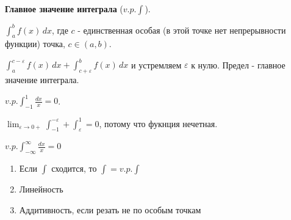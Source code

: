 \begin{definition}
    \textbf{Главное значение интеграла} ($v.p. \int$).

    $\int_{a}^{b} f(x) \, dx$, где $c$ - единственная особая (в этой точке нет непрерывности функции) точка, $c \in (a, b)$.

    $\int_{a}^{c - \varepsilon} f(x) \, dx + \int_{c + \varepsilon}^{b} f(x) \, dx$
    и устремляем $\varepsilon$ к нулю. Предел - главное значение интеграла.
\end{definition}

\begin{example}
    $v.p. \int_{-1}^{1} \frac{dx}{x} = 0$.

    $\lim_{\varepsilon \rightarrow 0+} \int_{-1}^{-\varepsilon} + \int_{\varepsilon}^{1} = 0$, потому что
    фукнция нечетная.

    $v.p. \int_{-\infty}^{\infty} \frac{dx}{x} = 0$
\end{example}

\begin{properties}
    \begin{enumerate}
        \item {
            Если $\int$ сходится, то $\int = v.p. \int$
        }
        \item {
            Линейность
        }
        \item {
            Аддитивность, если резать не по особым точкам
        }
    \end{enumerate}
\end{properties}

